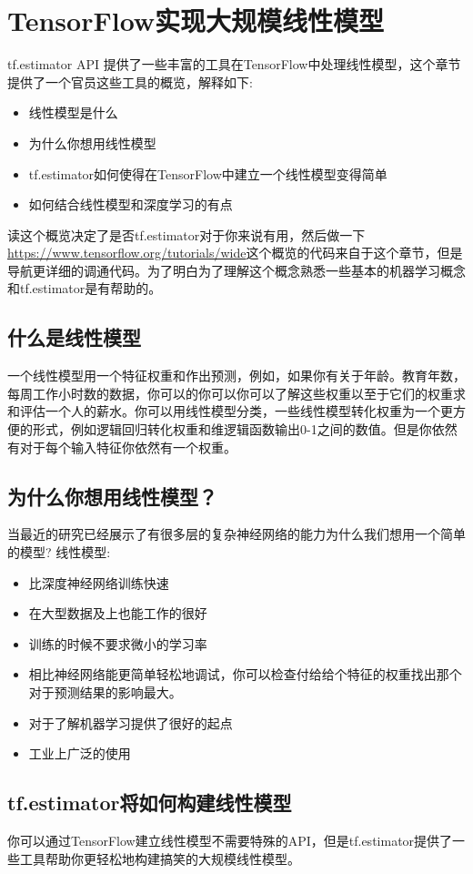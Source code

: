 \section{TensorFlow实现大规模线性模型}
tf.estimator API 提供了一些丰富的工具在TensorFlow中处理线性模型，这个章节提供了一个官员这些工具的概览，解释如下:
\begin{itemize}
  \item 线性模型是什么
  \item 为什么你想用线性模型
  \item tf.estimator如何使得在TensorFlow中建立一个线性模型变得简单
  \item 如何结合线性模型和深度学习的有点
\end{itemize}
读这个概览决定了是否tf.estimator对于你来说有用，然后做一下\href{Models tutorial}{https://www.tensorflow.org/tutorials/wide}这个概览的代码来自于这个章节，但是导航更详细的调通代码。为了明白为了理解这个概念熟悉一些基本的机器学习概念和tf.estimator是有帮助的。
\subsection{什么是线性模型}
一个线性模型用一个特征权重和作出预测，例如，如果你有关于年龄。教育年数，每周工作小时数的数据，你可以的你可以你可以了解这些权重以至于它们的权重求和评估一个人的薪水。你可以用线性模型分类，一些线性模型转化权重为一个更方便的形式，例如逻辑回归转化权重和维逻辑函数输出0-1之间的数值。但是你依然有对于每个输入特征你依然有一个权重。
\subsection{为什么你想用线性模型？}
当最近的研究已经展示了有很多层的复杂神经网络的能力为什么我们想用一个简单的模型?\newline
线性模型:
\begin{itemize}
  \item 比深度神经网络训练快速
  \item 在大型数据及上也能工作的很好
  \item 训练的时候不要求微小的学习率
  \item 相比神经网络能更简单轻松地调试，你可以检查付给给个特征的权重找出那个对于预测结果的影响最大。
  \item 对于了解机器学习提供了很好的起点
  \item 工业上广泛的使用
\end{itemize}
\subsection{tf.estimator将如何构建线性模型}
你可以通过TensorFlow建立线性模型不需要特殊的API，但是tf.estimator提供了一些工具帮助你更轻松地构建搞笑的大规模线性模型。
